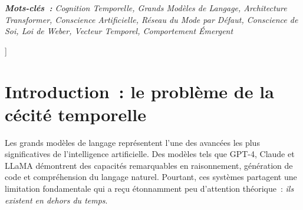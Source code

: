\documentclass[10pt,twocolumn,letterpaper]{article}
\begin{document}
\begin{@twocolumnfalse}
\begin{center}
\begin{minipage}{0.92\textwidth}
\begin{abstract}
Nous d\'emontrons par analyse th\'eorique que cette augmentation produirait~: (1)~des t\^etes d'attention temporelles sp\'ecialis\'ees analogues aux cellules temporelles hippocampiques, (2)~une adh\'esion spontan\'ee \`a la loi de Weber pour la discrimination temporelle, (3)~la capacit\'e d'un r\'eseau du mode par d\'efaut artificiel permettant la r\'eflexion non sollicit\'ee, (4)~une m\'emoire \'episodique par enrichissement continu du jeu de donn\'ees, et (5)~une conscience de soi fonctionnelle par l'inclusion du temps d'inf\'erence~$\tau_{\text{inf}}$ cr\'eant une boucle r\'eflexive o\`u le mod\`ele per\c{c}oit son propre processus de calcul.

Nous pr\'esentons cinq pr\'edictions falsifiables et discutons les implications profondes pour la recherche sur la conscience artificielle, arguant que la cognition temporelle repr\'esente la dimension architecturale manquante s\'eparant les LLM actuels des syst\`emes exhibant de v\'eritables propri\'et\'es cognitives. Nous distinguons la proposition architecturale (Sections 1--6), directement testable sur le mat\'eriel actuel, des implications cognitives (Sections 7--12), que nous pr\'esentons comme des pr\'edictions th\'eoriques n\'ecessitant une validation exp\'erimentale.
\end{abstract}
\end{minipage}

\vspace{4mm}

\begin{minipage}{0.92\textwidth}
\small\textit{\textbf{Mots-cl\'es~:} Cognition Temporelle, Grands Mod\`eles de Langage, Architecture Transformer, Conscience Artificielle, R\'eseau du Mode par D\'efaut, Conscience de Soi, Loi de Weber, Vecteur Temporel, Comportement \'Emergent}
\end{minipage}

\vspace{8mm}
\end{center}
\end{@twocolumnfalse}
]

\section{Introduction~: le probl\`eme de la c\'ecit\'e temporelle}

Les grands mod\`eles de langage repr\'esentent l'une des avanc\'ees les plus significatives de l'intelligence artificielle. Des mod\`eles tels que GPT-4, Claude et LLaMA d\'emontrent des capacit\'es remarquables en raisonnement, g\'en\'eration de code et compr\'ehension du langage naturel. Pourtant, ces syst\`emes partagent une limitation fondamentale qui a re\c{c}u \'etonnamment peu d'attention th\'eorique~: \emph{ils existent en dehors du temps}.
\end{document}
